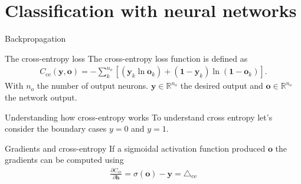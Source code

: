 \documentclass{beamer}
\begin{document}
    \section{Classification with neural networks}

%
    \begin{frame}{Backpropagation}
      \begin{figure}
         
      \end{figure}
    \end{frame}

    \begin{frame}{The cross-entropy loss}
      The cross-entropy loss function is defined as \cite{nielsen2015neural, bishop2006pattern}
      \begin{align} \label{eq:ce}
       C_{\text{ce}}(\mathbf{y}, \mathbf{o}) = -\sum_k^{n_o} [( \mathbf{y}_k  \ln \mathbf{o}_k) 
                                  + (\mathbf{1} - \mathbf{y}_k)
                                     \ln(\mathbf{1} - \mathbf{o}_k)].
      \end{align}
      With $n_o$ the number of output neurons. $\mathbf{y} \in \mathbb{R}^{n_o}$ the desired output and
      $\mathbf{o} \in \mathbb{R}^{n_o}$ the network output.
    \end{frame}

    \begin{frame}{Understanding how cross-entropy works}
      To understand cross entropy let's consider the boundary cases $y=0$ and $y=1$.
      \begin{figure}
        
        
      \end{figure}
    \end{frame}

    \begin{frame}{Gradients and cross-entropy}
      If a sigmoidal activation function produced $\mathbf{o}$ the gradients can be computed using ~\cite{nielsen2015neural,bishop2006pattern}
      \begin{align} 
         \frac{\partial C_{ce}}{\partial \mathbf{h}} 
         = \sigma(\mathbf{o}) - \mathbf{y} = \triangle_{\text{ce}}
      \end{align}
    \end{frame}
\end{document}
